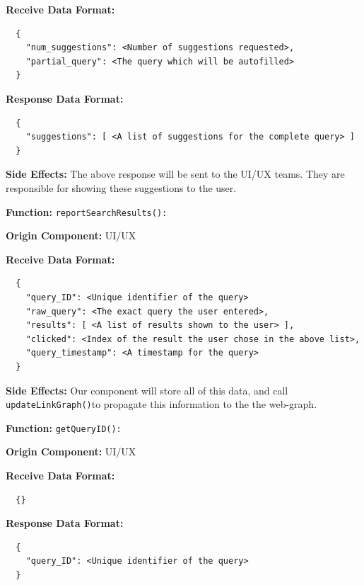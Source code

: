 \textbf{Receive Data Format:} \begin{verbatim}
  {
    "num_suggestions": <Number of suggestions requested>,
    "partial_query": <The query which will be autofilled>
  }
\end{verbatim}

\textbf{Response Data Format:} \begin{verbatim}
  {
    "suggestions": [ <A list of suggestions for the complete query> ]
  }
\end{verbatim}

\smallskip

\textbf{Side Effects:} The above response will be sent to the UI/UX teams. They are responsible for showing these suggestions to the user.

\bigskip

\textbf{Function:} \verb|reportSearchResults():|

\smallskip

\textbf{Origin Component:} UI/UX

\smallskip

\textbf{Receive Data Format:} \begin{verbatim}
  {
    "query_ID": <Unique identifier of the query>
    "raw_query": <The exact query the user entered>,
    "results": [ <A list of results shown to the user> ],
    "clicked": <Index of the result the user chose in the above list>,
    "query_timestamp": <A timestamp for the query>
  }
\end{verbatim}

\smallskip

\textbf{Side Effects:} Our component will store all of this data, and call \verb|updateLinkGraph()|to propagate this information to the the web-graph.

\bigskip

\textbf{Function:} \verb|getQueryID():|

\smallskip

\textbf{Origin Component:} UI/UX

\smallskip

\textbf{Receive Data Format:} \begin{verbatim}
  {}
\end{verbatim}

\textbf{Response Data Format:} \begin{verbatim}
  {
    "query_ID": <Unique identifier of the query>
  }
\end{verbatim}

\smallskip

